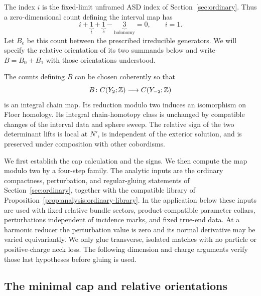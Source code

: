 The index $i$ is the fixed-limit unframed ASD index of
Section~\ref{sec:ordinary}.  Thus a zero-dimensional count defining the
interval map has
\begin{equation}\label{eq:negative:dimension}
 i+\underbrace{1}_{t}+\underbrace{1}_{s}
       -\underbrace{3}_{\text{holonomy}}=0,
 \qquad i=1.
\end{equation}
Let $B_e$ be this count between the prescribed irreducible generators.
We will specify the relative orientation of its two summands below and
write $B=B_0+B_1$ with those orientations understood.

\begin{theorem}\label{thm:negative:unit}
The counts defining $B$ can be chosen coherently so that
\[
 B\colon C(Y_2;\mathbb Z)\longrightarrow C(Y_{-2};\mathbb Z)
\]
is an integral chain map.  Its reduction modulo two induces an
isomorphism on Floer homology.  Its integral chain-homotopy class is
unchanged by compatible changes of the interval data and sphere sweep.
The relative sign of the two determinant lifts is local at $N'$,
is independent of the exterior solution, and is preserved under
composition with other cobordisms.
\end{theorem}

We first establish the cap calculation and the signs.  We then compute
the map modulo two by a four-step family.  The analytic inputs are the
ordinary compactness, perturbation, and regular-gluing statements of
Section~\ref{sec:ordinary}, together with the compatible library of
Proposition~\ref{prop:analysis:ordinary-library}.  In the application
below these inputs are used with fixed relative bundle sectors,
product-compatible parameter collars, perturbations independent of
incidence marks, and fixed true-end data.  At a harmonic reducer the
perturbation value is zero and its normal derivative may be varied
equivariantly.  We only glue transverse, isolated matches with no
particle or positive-charge neck loss.  The following dimension and
charge arguments verify those last hypotheses before gluing is used.

\subsection{The minimal cap and relative orientations}

